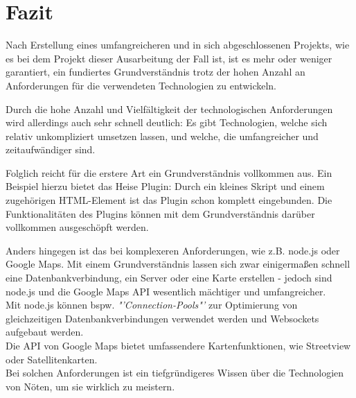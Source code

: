 \chapter{Fazit}
\label{Fazit}
Nach Erstellung eines umfangreicheren und in sich abgeschlossenen Projekts, wie es bei dem Projekt dieser Ausarbeitung der Fall ist, ist es mehr oder weniger garantiert, ein fundiertes Grundverständnis trotz der hohen Anzahl an Anforderungen für die verwendeten Technologien zu entwickeln. 
\par
Durch die hohe Anzahl und Vielfältigkeit der technologischen Anforderungen wird allerdings auch sehr schnell deutlich: Es gibt Technologien, welche sich relativ unkompliziert umsetzen lassen, und welche, die umfangreicher und zeitaufwändiger sind. 
\par
Folglich reicht für die erstere Art ein Grundverständnis vollkommen aus. Ein Beispiel hierzu bietet das Heise Plugin: Durch ein kleines Skript und einem zugehörigen HTML-Element ist das Plugin schon komplett eingebunden. Die Funktionalitäten des Plugins können mit dem Grundverständnis darüber vollkommen ausgeschöpft werden.
\par
Anders hingegen ist das bei komplexeren Anforderungen, wie z.B. node.js oder Google Maps. Mit einem Grundverständnis lassen sich zwar einigermaßen schnell eine Datenbankverbindung, ein Server oder eine Karte erstellen - jedoch sind node.js und die Google Maps API wesentlich mächtiger und umfangreicher. 
\\
Mit node.js können bspw. \textit{"'Connection-Pools"'} zur Optimierung von gleichzeitigen Datenbankverbindungen verwendet werden und Websockets aufgebaut werden. 
\\
Die API von Google Maps bietet umfassendere Kartenfunktionen, wie Streetview oder Satellitenkarten.
\\
Bei solchen Anforderungen ist ein tiefgründigeres Wissen über die Technologien von Nöten, um sie wirklich zu meistern.
